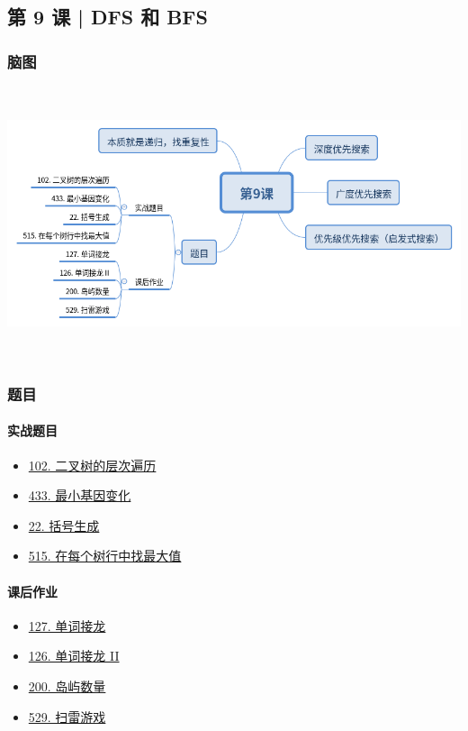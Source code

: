 \subsection{第 9 课 | DFS 和 BFS}

\subsubsection{脑图}

\includegraphics[width=170mm,height=80mm]{images/camp/第9课.png}

\subsubsection{题目}

\paragraph{实战题目}

\begin{itemize}
  \item \hyperref[leetcode:102]{102. 二叉树的层次遍历}
  \item \hyperref[leetcode:433]{433. 最小基因变化}
  \item \hyperref[leetcode:22]{22. 括号生成}
  \item \hyperref[leetcode:515]{515. 在每个树行中找最大值}
\end{itemize}

\paragraph{课后作业}

\begin{itemize}
  \item \hyperref[leetcode:127]{127. 单词接龙}
  \item \hyperref[leetcode:126]{126. 单词接龙 II}
  \item \hyperref[leetcode:200]{200. 岛屿数量}
  \item \hyperref[leetcode:529]{529. 扫雷游戏}
\end{itemize}
